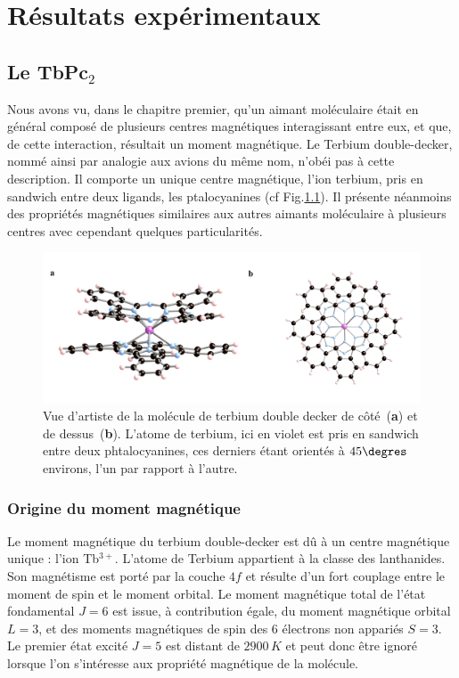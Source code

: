 \chapter{Résultats expérimentaux}

\section{Le TbPc$_2$}
Nous avons vu, dans le chapitre premier, qu'un aimant moléculaire était en général composé de plusieurs centres magnétiques interagissant entre eux, et que, de cette interaction, résultait un moment magnétique. Le Terbium double-decker, nommé ainsi par analogie aux avions du même nom, n’obéi pas à cette description. Il comporte un unique centre magnétique, l'ion terbium, pris en sandwich entre deux ligands, les ptalocyanines (cf Fig.\ref{TbPc2Imag}). Il présente néanmoins des propriétés magnétiques similaires aux autres aimants moléculaire à plusieurs centres avec cependant quelques particularités.

\begin{figure}
\centering \includegraphics[scale=0.45]{Resultats/TbPc2Imag/TbPc2Imag.pdf} 
\caption{Vue d'artiste de la molécule de terbium double decker de côté~(\textbf{a}) et de dessus~(\textbf{b}). L'atome de terbium, ici en violet est pris en sandwich entre deux phtalocyanines, ces derniers étant orientés à $45\degres$ environs, l'un par rapport à l'autre.}
\label{TbPc2Imag}
\end{figure}





\subsection{Origine du moment magnétique}
Le moment magnétique du terbium double-decker est d\^u à un centre magnétique unique : l'ion Tb$^{3+}$. L'atome de Terbium appartient à la classe des lanthanides. Son magnétisme est porté par la couche $4f$ et résulte d'un fort couplage entre le moment de spin et le moment orbital. Le moment magnétique total de l'état fondamental $J=6$ est issue, à contribution égale, du moment magnétique orbital $L=3$, et des moments magnétiques de spin des 6 électrons non appariés $S=3$. Le premier état excité $J=5$ est distant de $2900\,K$ et peut donc \^etre ignoré lorsque l'on s'intéresse aux propriété magnétique de la molécule.
 

